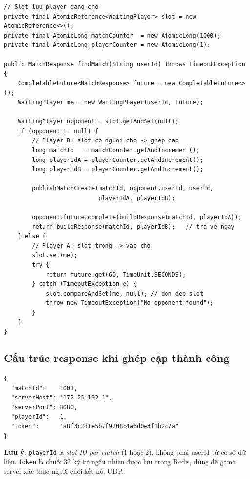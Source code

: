 \documentclass[12pt,a4paper]{report}
\begin{document}
\begin{lstlisting}[style=javaStyle, caption={Cơ chế ghép cặp dùng AtomicReference và CompletableFuture}, label={lst:matching}]
// Slot luu player dang cho
private final AtomicReference<WaitingPlayer> slot = new AtomicReference<>();
private final AtomicLong matchCounter  = new AtomicLong(1000);
private final AtomicLong playerCounter = new AtomicLong(1);

public MatchResponse findMatch(String userId) throws TimeoutException {
    CompletableFuture<MatchResponse> future = new CompletableFuture<>();
    WaitingPlayer me = new WaitingPlayer(userId, future);

    WaitingPlayer opponent = slot.getAndSet(null);
    if (opponent != null) {
        // Player B: slot co nguoi cho -> ghep cap
        long matchId   = matchCounter.getAndIncrement();
        long playerIdA = playerCounter.getAndIncrement();
        long playerIdB = playerCounter.getAndIncrement();

        publishMatchCreate(matchId, opponent.userId, userId,
                           playerIdA, playerIdB);

        opponent.future.complete(buildResponse(matchId, playerIdA));
        return buildResponse(matchId, playerIdB);   // tra ve ngay
    } else {
        // Player A: slot trong -> vao cho
        slot.set(me);
        try {
            return future.get(60, TimeUnit.SECONDS);
        } catch (TimeoutException e) {
            slot.compareAndSet(me, null); // don dep slot
            throw new TimeoutException("No opponent found");
        }
    }
}
\end{lstlisting}

\subsection{Cấu trúc response khi ghép cặp thành công}

\begin{lstlisting}[style=jsonStyle, caption={Response trả về cho client sau khi ghép cặp}, label={lst:matchresponse}]
{
  "matchId":    1001,
  "serverHost": "172.25.192.1",
  "serverPort": 8080,
  "playerId":   1,
  "token":      "a8f3c2d1e5b7f9208c4a6d0e3f1b2c7a"
}
\end{lstlisting}

\textbf{Lưu ý}: \texttt{playerId} là \textit{slot ID per-match} (1 hoặc 2), không phải userId từ cơ sở dữ liệu. \texttt{token} là chuỗi 32 ký tự ngẫu nhiên được lưu trong Redis, dùng để game server xác thực người chơi kết nối UDP.
\end{document}

